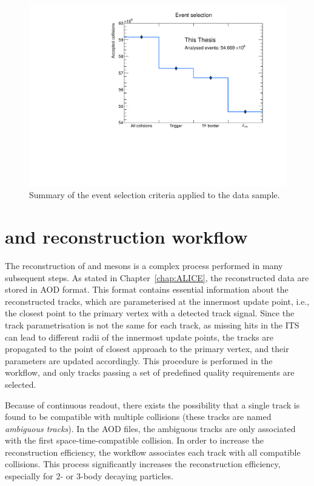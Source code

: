 \begin{figure}[htb]
    \centering
    \includegraphics[width=0.7\linewidth]{Figures/Chapter 4/EventSelection.pdf}
    \caption{Summary of the event selection criteria applied to the data sample.}
    \label{fig:EvSel}
\end{figure}

\section{\texorpdfstring{\ds and \dpl reconstruction workflow}{Ds+ and D+ reconstruction workflow}}
The reconstruction of \ds and \dpl mesons is a complex process performed in many subsequent steps. As stated in Chapter~\ref{chap:ALICE}, the reconstructed data are stored in AOD format. This format contains essential information about the reconstructed tracks, which are parameterised at the innermost update point, i.e., the closest point to the primary vertex with a detected track signal. Since the track parametrisation is not the same for each track, as missing hits in the ITS can lead to different radii of the innermost update points, the tracks are propagated to the point of closest approach to the primary vertex, and their parameters are updated accordingly. This procedure is performed in the  workflow, and only tracks passing a set of predefined quality requirements are selected. 

Because of continuous readout, there exists the possibility that a single track is found to be compatible with multiple collisions (these tracks are named \emph{ambiguous tracks}). In the AOD files, the ambiguous tracks are only associated with the first space-time-compatible collision. In order to increase the reconstruction efficiency, the  workflow associates each track with all compatible collisions. This process significantly increases the reconstruction efficiency, especially for 2- or 3-body decaying particles.

